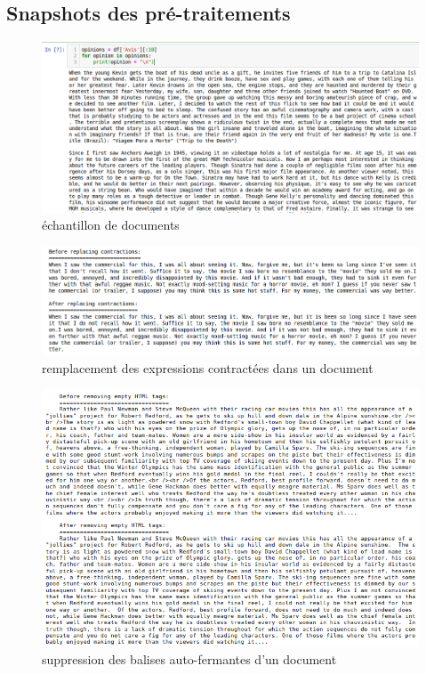 \documentclass[12pt,a4paper]{report}
\theoremstyle{definition}
\begin{document}
\begin{appendices}
\chapter{Snapshots des pré-traitements}
\begin{figure}[!ht]
  \centering
  \includegraphics[scale=0.4]{images/snapshots/documents_sample.png}
  \caption{échantillon de documents}
  \label{fig:document_sample}
\end{figure}

\begin{figure}[!ht]
  \centering
  \includegraphics[scale=0.4]{images/snapshots/replace_contractions.png}
  \caption{remplacement des expressions contractées dans un document}
  \label{fig:replace_contractions}
\end{figure}

\begin{figure}[!ht]
  \centering
  \includegraphics[scale=0.6]{images/snapshots/remove_empty_html_tags.png}
  \caption{suppression des balises auto-fermantes d'un document}
  \label{fig:remove_empty_html_tags}
\end{figure}


\end{appendices}
\end{document}
